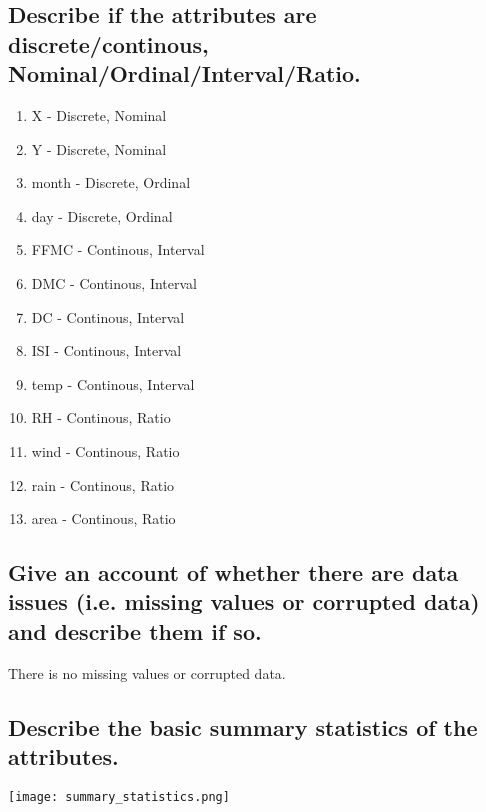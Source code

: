 \subsection*{Describe if the attributes are discrete/continous, Nominal/Ordinal/Interval/Ratio.}
	\begin{enumerate}
	\item X - Discrete, Nominal
	\item Y - Discrete, Nominal
	\item month - Discrete, Ordinal
	\item day - Discrete, Ordinal
	\item FFMC - Continous, Interval
	\item DMC - Continous, Interval
	\item DC - Continous, Interval
	\item ISI - Continous, Interval
	\item temp - Continous, Interval
	\item RH - Continous, Ratio
	\item wind - Continous, Ratio
	\item rain - Continous, Ratio
	\item area - Continous, Ratio
	\end{enumerate}
\subsection*{Give an account of whether there are data issues (i.e. missing values or corrupted data) and describe them if so.}
There is no missing values or corrupted data.
\subsection*{Describe the basic summary statistics of the attributes.}
\texttt{[image: summary\_statistics.png]}